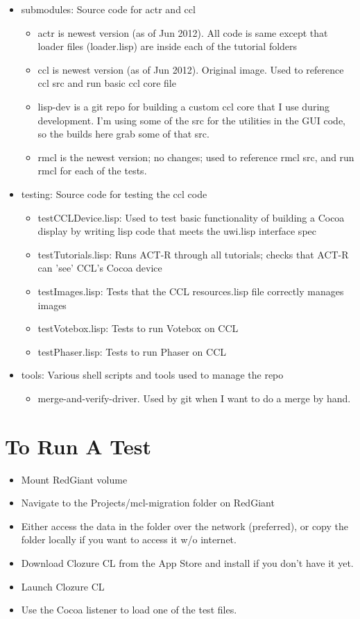\documentclass[12pt]{article} %
\begin{document}
\begin{itemize}
\item submodules: Source code for actr and ccl
	\begin{itemize}
	\item actr is newest version (as of Jun 2012). All code is same except that loader files (loader.lisp) are inside each of the tutorial folders
	\item ccl is newest version (as of Jun 2012). Original image. Used to reference ccl src and run basic ccl core file
	\item lisp-dev is a git repo for building a custom ccl core that I use during development. I'm using some of the src for the utilities in the GUI code, so the builds here grab some of that src.
	\item rmcl is the newest version; no changes; used to reference rmcl src, and run rmcl for each of the tests.
	\end{itemize}

\item testing: Source code for testing the ccl code
	\begin{itemize}
	\item testCCLDevice.lisp: Used to test basic functionality of building a Cocoa display by writing lisp code that meets the uwi.lisp interface spec
	\item testTutorials.lisp: Runs ACT-R through all tutorials; checks that ACT-R can 'see' CCL's Cocoa device
	\item testImages.lisp: Tests that the CCL resources.lisp file correctly manages images
	\item testVotebox.lisp: Tests to run Votebox on CCL
	\item testPhaser.lisp: Tests to run Phaser on CCL
	\end{itemize}

\item tools: Various shell scripts and tools used to manage the repo
	\begin{itemize}
	\item merge-and-verify-driver. Used by git when I want to do a merge by hand.
	\end{itemize}

\end{itemize}

\section{To Run A Test}

\begin{itemize}
\item Mount RedGiant volume	
\item Navigate to the Projects/mcl-migration folder on RedGiant
\item Either access the data in the folder over the network (preferred), or copy the folder locally if you want to access it w/o internet.
\item Download Clozure CL from the App Store and install if you don't have it yet.
\item Launch Clozure CL
\item Use the Cocoa listener to load one of the test files.
\end{itemize}
\end{document}
